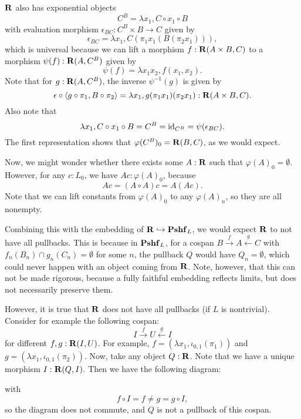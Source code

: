 $ \mathbf{R} $ also has exponential objects
\[ C^B = \lambda x_1, C \circ x_1 \circ B \]
with evaluation morphism $ \epsilon_{BC}: C^B \times B \to C $ given by
\[ \epsilon_{BC} = \lambda x_1, C(\pi_1 x_1 (B (\pi_2 x_1))), \]
which is universal because we can lift a morphism $ f: \mathbf{R}(A \times B, C) $ to a morphism $ \psi(f): \mathbf{R}(A, C^B) $ given by
\[ \psi(f) = \lambda x_1 x_2, f (x_1, x_2). \]
Note that for $ g: \mathbf{R}(A, C^B) $, the inverse $ \psi^{-1}(g) $ is given by
\[ \epsilon \circ \langle g \circ \pi_1, B \circ \pi_2 \rangle = \lambda x_1, g (\pi_1 x_1) (\pi_2 x_1): \mathbf{R}(A \times B, C). \]
Also note that
\[ \lambda x_1, C \circ x_1 \circ B = C^B = \text{id}_{C^B} = \psi(\epsilon_{BC}). \]
The first representation shows that $ \varphi(C^B)_0 = \mathbf{R}(B, C) $, as we would expect.

Now, we might wonder whether there exists some $ A: \mathbf{R} $ such that $ \varphi(A)_0 = \emptyset $. However, for any $ c : L_0 $, we have $ A c : \varphi(A)_0 $, because
\[ A c = (A \circ A) c = A (A c). \]
Note that we can lift constants from $ \varphi(A)_0 $ to any $ \varphi(A)_n $, so they are all nonempty.

Combining this with the embedding of $ \mathbf{R} \hookrightarrow \mathbf{Pshf}_{L} $, we would expect $ \mathbf{R} $ to not have all pullbacks. This is because in $ \mathbf{Pshf}_{L} $, for a cospan $ B \xrightarrow f A \xleftarrow g C $ with $ f_n(B_n) \cap g_n(C_n) = \emptyset $ for some $ n $, the pullback $ Q $ would have $ Q_n = \emptyset $, which could never happen with an object coming from $ \mathbf{R} $. Note, however, that this can not be made rigorous, because a fully faithful embedding reflects limits, but does not necessarily preserve them.

However, it is true that $ \mathbf{R} $ does not have all pullbacks (if $ L $ is nontrivial). Consider for example the following cospan:
\[ I \xrightarrow f U \xleftarrow g I \]
for different $ f, g: \mathbf{R}(I, U) $. For example, $ f = (\lambda x_1, \iota_{0, 1}(\pi_1)) $ and $ g = (\lambda x_1, \iota_{0, 1}(\pi_2)) $. Now, take any object $ Q: \mathbf{R} $. Note that we have a unique morphism $ I: \mathbf{R}(Q, I) $. Then we have the following diagram:
\begin{center}
\end{center}
with
\[ f \circ I = f \not = g = g \circ I, \]
so the diagram does not commute, and $ Q $ is not a pullback of this cospan.

